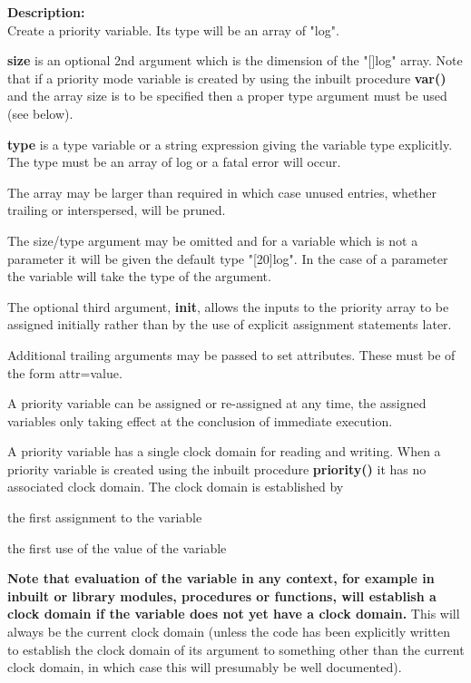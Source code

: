         {\bf Description:} \\
        Create a priority variable. Its type will be an array of "log".
        
        {\bf size} is an optional 2nd argument which is the dimension of the
        "[]log" array. Note that if a priority mode variable is created by using
        the inbuilt procedure {\bf var()}  and the array
        size is to be specified then a proper type
        argument must be used (see below).

        {\bf type} is a type variable or a string expression giving the variable
        type explicitly. The type must be an array of log or a fatal error will
        occur.
        
        The array may be larger than required in which case unused entries,
        whether trailing or interspersed, will be pruned.

        The size/type argument may be omitted and for a variable which is not a
        parameter it will be given the default type "[20]log".
        In the case of a parameter the variable will take the type of the
        argument.
        
        The optional third argument, {\bf init}, allows the inputs to the
        priority array to be assigned initially rather than by the use of
        explicit assignment statements later.
        
        Additional trailing arguments may be passed to set attributes. These
        must be of the form attr=value.
        
        A priority variable can be assigned or re-assigned at any time,
        the assigned variables only taking effect at the conclusion of
        immediate execution.
        
        A priority variable has a single clock domain for reading and writing.
        When a priority variable is created using the inbuilt procedure {\bf
        priority()} it has no associated clock domain. The clock domain is
        established by
        \blist
        \item   the first assignment to the variable
        \item   the first use of the value of the variable
        \blend
        
        {\bf Note that evaluation of the variable in any context, for example
        in inbuilt or library modules, procedures or functions, will establish
        a clock domain if the variable does not yet have a clock domain.}
        This will always be the current clock domain (unless the code has
        been explicitly written to establish the clock domain of its argument
        to something other than the current clock domain, in which case
        this will presumably be well documented).
        

